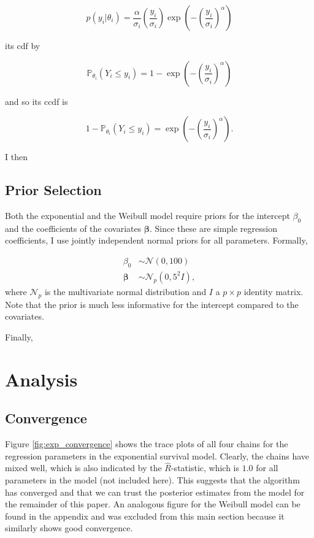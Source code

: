 \documentclass[11pt]{article}
\begin{document}
\begin{equation*}
    p(y_i|\theta_i) = \frac{\alpha}{\sigma_i} \left(\frac{y_i}{\sigma_i}\right) \exp\left(-\left(\frac{y_i}{\sigma_i}\right)^{\alpha}\right)
\end{equation*}

its cdf by

\begin{equation*}
    \mathbb{P}_{\theta_i}(Y_i \leq y_i) = 1 - \exp\left(-\left(\frac{y_i}{\sigma_i}\right)^{\alpha}\right)
\end{equation*}

and so its ccdf is

\begin{equation*}
    1 - \mathbb{P}_{\theta_i}(Y_i \leq y_i) = \exp\left(-\left(\frac{y_i}{\sigma_i}\right)^{\alpha}\right).
\end{equation*}

I then 

\subsection{Prior Selection}
Both the exponential and the Weibull model require priors for the intercept $\beta_0$ and the coefficients of the covariates $\bm\beta$. Since these are simple regression coefficients, I use jointly independent normal priors for all parameters. Formally, 

\begin{align*}
    \beta_0 &\sim \mathcal{N}(0, 100) \\
    \bm{\beta} &\sim \mathcal{N}_{p}(0, 5^2I),
\end{align*}
where $\mathcal{N}_p$ is the multivariate normal distribution and $I$ a $p\times p$ identity matrix. Note that the prior is much less informative for the intercept compared to the covariates. 

Finally, 

\section{Analysis}
\subsection{Convergence}
Figure \ref{fig:exp_convergence} shows the trace plots of all four chains for the regression parameters in the exponential survival model. Clearly, the chains have mixed well, which is also indicated by the $\hat{R}$-statistic, which is $1.0$ for all parameters in the model (not included here). This suggests that the algorithm has converged and that we can trust the posterior estimates from the model for the remainder of this paper. An analogous figure for the Weibull model can be found in the appendix and was excluded from this main section because it similarly shows good convergence.
\end{document}
